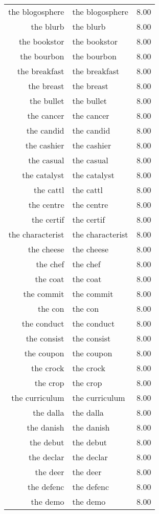 \begin{table}[ht]
\begin{tabular}{rlr}
  the blogosphere & the blogosphere & 8.00 \\ 
  the blurb & the blurb & 8.00 \\ 
  the bookstor & the bookstor & 8.00 \\ 
  the bourbon & the bourbon & 8.00 \\ 
  the breakfast & the breakfast & 8.00 \\ 
  the breast & the breast & 8.00 \\ 
  the bullet & the bullet & 8.00 \\ 
  the cancer & the cancer & 8.00 \\ 
  the candid & the candid & 8.00 \\ 
  the cashier & the cashier & 8.00 \\ 
  the casual & the casual & 8.00 \\ 
  the catalyst & the catalyst & 8.00 \\ 
  the cattl & the cattl & 8.00 \\ 
  the centre & the centre & 8.00 \\ 
  the certif & the certif & 8.00 \\ 
  the characterist & the characterist & 8.00 \\ 
  the cheese & the cheese & 8.00 \\ 
  the chef & the chef & 8.00 \\ 
  the coat & the coat & 8.00 \\ 
  the commit & the commit & 8.00 \\ 
  the con & the con & 8.00 \\ 
  the conduct & the conduct & 8.00 \\ 
  the consist & the consist & 8.00 \\ 
  the coupon & the coupon & 8.00 \\ 
  the crock & the crock & 8.00 \\ 
  the crop & the crop & 8.00 \\ 
  the curriculum & the curriculum & 8.00 \\ 
  the dalla & the dalla & 8.00 \\ 
  the danish & the danish & 8.00 \\ 
  the debut & the debut & 8.00 \\ 
  the declar & the declar & 8.00 \\ 
  the deer & the deer & 8.00 \\ 
  the defenc & the defenc & 8.00 \\ 
  the demo & the demo & 8.00 \\ 

\end{tabular}
\end{table}
